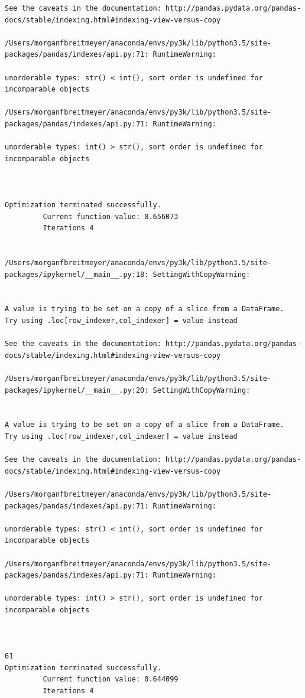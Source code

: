 \begin{lstlisting}
See the caveats in the documentation: http://pandas.pydata.org/pandas-docs/stable/indexing.html#indexing-view-versus-copy

/Users/morganfbreitmeyer/anaconda/envs/py3k/lib/python3.5/site-packages/pandas/indexes/api.py:71: RuntimeWarning:

unorderable types: str() < int(), sort order is undefined for incomparable objects

/Users/morganfbreitmeyer/anaconda/envs/py3k/lib/python3.5/site-packages/pandas/indexes/api.py:71: RuntimeWarning:

unorderable types: int() > str(), sort order is undefined for incomparable objects



Optimization terminated successfully.
         Current function value: 0.656073
         Iterations 4


/Users/morganfbreitmeyer/anaconda/envs/py3k/lib/python3.5/site-packages/ipykernel/__main__.py:18: SettingWithCopyWarning:


A value is trying to be set on a copy of a slice from a DataFrame.
Try using .loc[row_indexer,col_indexer] = value instead

See the caveats in the documentation: http://pandas.pydata.org/pandas-docs/stable/indexing.html#indexing-view-versus-copy

/Users/morganfbreitmeyer/anaconda/envs/py3k/lib/python3.5/site-packages/ipykernel/__main__.py:20: SettingWithCopyWarning:


A value is trying to be set on a copy of a slice from a DataFrame.
Try using .loc[row_indexer,col_indexer] = value instead

See the caveats in the documentation: http://pandas.pydata.org/pandas-docs/stable/indexing.html#indexing-view-versus-copy

/Users/morganfbreitmeyer/anaconda/envs/py3k/lib/python3.5/site-packages/pandas/indexes/api.py:71: RuntimeWarning:

unorderable types: str() < int(), sort order is undefined for incomparable objects

/Users/morganfbreitmeyer/anaconda/envs/py3k/lib/python3.5/site-packages/pandas/indexes/api.py:71: RuntimeWarning:

unorderable types: int() > str(), sort order is undefined for incomparable objects



61
Optimization terminated successfully.
         Current function value: 0.644099
         Iterations 4



\end{lstlisting}
